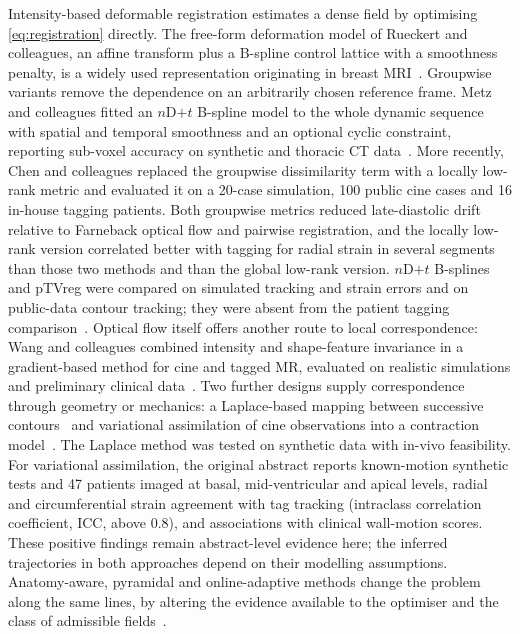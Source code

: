 Intensity-based deformable registration estimates a dense field by optimising \cref{eq:registration} directly. The free-form deformation model of Rueckert and colleagues, an affine transform plus a B-spline control lattice with a smoothness penalty, is a widely used representation originating in breast MRI~\cite{rueckert1999}. Groupwise variants remove the dependence on an arbitrarily chosen reference frame. Metz and colleagues fitted an \(n\)D\(+t\) B-spline model to the whole dynamic sequence with spatial and temporal smoothness and an optional cyclic constraint, reporting sub-voxel accuracy on synthetic and thoracic CT data~\cite{metz2011}. More recently, Chen and colleagues replaced the groupwise dissimilarity term with a locally low-rank metric and evaluated it on a 20-case simulation, 100 public cine cases and 16 in-house tagging patients. Both groupwise metrics reduced late-diastolic drift relative to Farneback optical flow and pairwise registration, and the locally low-rank version correlated better with tagging for radial strain in several segments than those two methods and than the global low-rank version. \(n\)D\(+t\) B-splines and pTVreg were compared on simulated tracking and strain errors and on public-data contour tracking; they were absent from the patient tagging comparison~\cite{chen2024}. Optical flow itself offers another route to local correspondence: Wang and colleagues combined intensity and shape-feature invariance in a gradient-based method for cine and tagged MR, evaluated on realistic simulations and preliminary clinical data~\cite{wang2019opticalflow}. Two further designs supply correspondence through geometry or mechanics: a Laplace-based mapping between successive contours~\cite{elnakib2015laplace} and variational assimilation of cine observations into a contraction model~\cite{tuyisenge2016assimilation}. The Laplace method was tested on synthetic data with in-vivo feasibility. For variational assimilation, the original abstract reports known-motion synthetic tests and 47 patients imaged at basal, mid-ventricular and apical levels, radial and circumferential strain agreement with tag tracking (intraclass correlation coefficient, ICC, above 0.8), and associations with clinical wall-motion scores. These positive findings remain abstract-level evidence here; the inferred trajectories in both approaches depend on their modelling assumptions. Anatomy-aware, pyramidal and online-adaptive methods change the problem along the same lines, by altering the evidence available to the optimiser and the class of admissible fields~\cite{chen2020anatomy,yu2020mpn,yu2020foal}.

